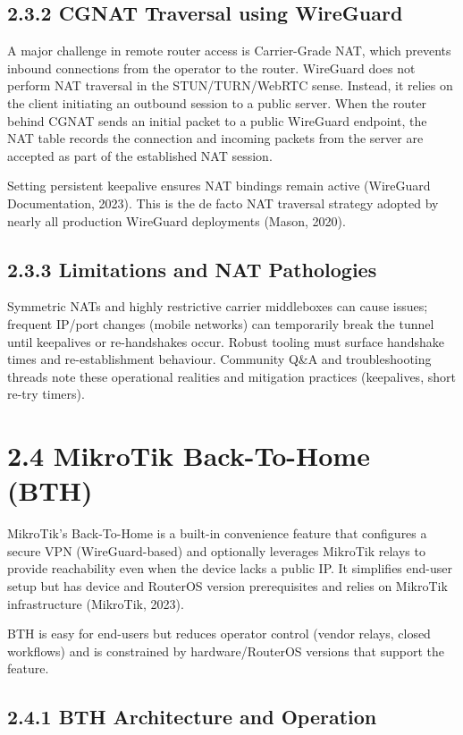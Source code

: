 \documentclass[12pt,a4paper,oneside]{report}
\begin{document}
\subsection{2.3.2 CGNAT Traversal using WireGuard}

A major challenge in remote router access is Carrier-Grade NAT, which prevents inbound connections from the operator to the router. WireGuard does not perform NAT traversal in the STUN/TURN/WebRTC sense. Instead, it relies on the client initiating an outbound session to a public server. When the router behind CGNAT sends an initial packet to a public WireGuard endpoint, the NAT table records the connection and incoming packets from the server are accepted as part of the established NAT session.

Setting persistent keepalive ensures NAT bindings remain active (WireGuard Documentation, 2023). This is the de facto NAT traversal strategy adopted by nearly all production WireGuard deployments (Mason, 2020).

\subsection{2.3.3 Limitations and NAT Pathologies}

Symmetric NATs and highly restrictive carrier middleboxes can cause issues; frequent IP/port changes (mobile networks) can temporarily break the tunnel until keepalives or re-handshakes occur. Robust tooling must surface handshake times and re-establishment behaviour. Community Q\&A and troubleshooting threads note these operational realities and mitigation practices (keepalives, short re-try timers).

\section{2.4 MikroTik Back-To-Home (BTH)}

MikroTik's Back-To-Home is a built-in convenience feature that configures a secure VPN (WireGuard-based) and optionally leverages MikroTik relays to provide reachability even when the device lacks a public IP. It simplifies end-user setup but has device and RouterOS version prerequisites and relies on MikroTik infrastructure (MikroTik, 2023).

BTH is easy for end-users but reduces operator control (vendor relays, closed workflows) and is constrained by hardware/RouterOS versions that support the feature.

\subsection{2.4.1 BTH Architecture and Operation}
\end{document}
